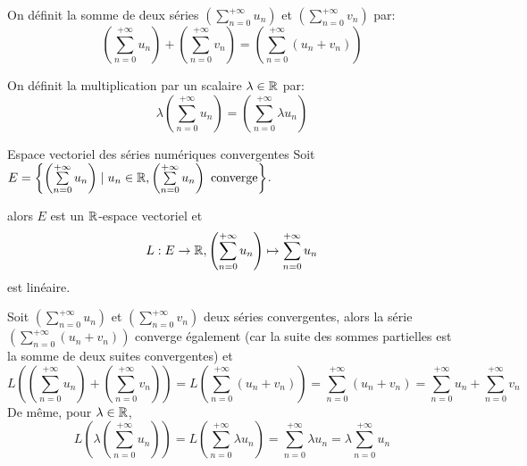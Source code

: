 \documentclass[a4paper, 12pt]{article}
\begin{document}
\begin{definition}
    On définit la somme de deux séries $(\sum\limits_{n=0}^{+\infty} u_n)$ et $(\sum\limits_{n=0}^{+\infty} v_n)$ par:
    $$
    \left(\sum\limits_{n=0}^{+\infty} u_n\right) + \left(\sum\limits_{n=0}^{+\infty} v_n\right) = \left(\sum\limits_{n=0}^{+\infty} (u_n + v_n)\right)
    $$

    On définit la multiplication par un scalaire $\lambda \in \mathbb{R}$ par:
    $$
    \lambda \left(\sum\limits_{n=0}^{+\infty} u_n\right) = \left(\sum\limits_{n=0}^{+\infty} \lambda u_n\right)
    $$
\end{definition}

\begin{proposition}{Espace vectoriel des séries numériques convergentes}{}
    Soit $E = \left\{ \left(\sum\limits_{n=0}^{+\infty} u_n\right) \mid u_n \in \mathbb{R}, \left(\sum\limits_{n=0}^{+\infty} u_n\right) \text{ converge} \right\}$.

    alors $E$ est un $\mathbb{R}$-espace vectoriel et
    $$
    L: E \rightarrow \mathbb{R}, \left(\sum\limits_{n=0}^{+\infty} u_n\right) \mapsto \sum\limits_{n=0}^{+\infty} u_n
    $$
    est linéaire.
\end{proposition}

\begin{demonstration}
    Soit $\left(\sum\limits_{n=0}^{+\infty} u_n\right)$ et $\left(\sum\limits_{n=0}^{+\infty} v_n\right)$ deux séries convergentes, alors la série $\left(\sum\limits_{n=0}^{+\infty} (u_n + v_n)\right)$ converge également (car la suite des sommes partielles est la somme de deux suites convergentes) et
    $$
    L\left(\left(\sum\limits_{n=0}^{+\infty} u_n\right) + \left(\sum\limits_{n=0}^{+\infty} v_n\right)\right) = L\left(\sum\limits_{n=0}^{+\infty} (u_n + v_n)\right) = \sum\limits_{n=0}^{+\infty} (u_n + v_n) = \sum\limits_{n=0}^{+\infty} u_n + \sum\limits_{n=0}^{+\infty} v_n
    $$
    De même, pour $\lambda \in \mathbb{R}$,
    $$
    L\left(\lambda \left(\sum\limits_{n=0}^{+\infty} u_n\right)\right) = L\left(\sum\limits_{n=0}^{+\infty} \lambda u_n\right) = \sum\limits_{n=0}^{+\infty} \lambda u_n = \lambda \sum\limits_{n=0}^{+\infty} u_n
    $$
\end{demonstration}
\end{document}

